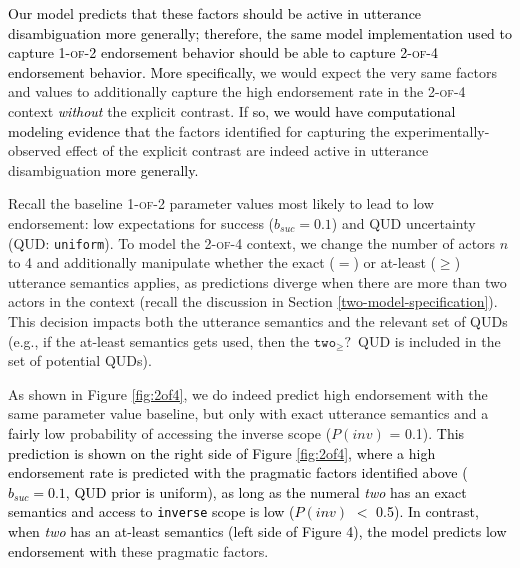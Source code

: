 \documentclass[cm]{glossa}
\newcommand{\lp}[1]{\textcolor{black}{#1}} %
\begin{document}
\lp{Our model predicts that these factors should be active in utterance disambiguation more generally; therefore, the same model implementation used to capture \textsc{1-of-2} endorsement behavior should be able to capture \textsc{2-of-4} endorsement behavior.}
\lp{More specifically,}
we would expect the very same factors and values to additionally capture the high endorsement rate in the \textsc{2-of-4} context \lp{\emph{without}} the explicit contrast. 
If \lp{so, we would have computational modeling evidence that}
the factors identified for capturing the experimentally-observed effect of the explicit contrast are indeed active in utterance disambiguation \lp{more generally.} 



Recall the baseline \textsc{1-of-2} parameter values most likely to lead to low endorsement: low expectations for success ($b_{suc}=0.1$) and QUD uncertainty (QUD: \texttt{uniform}). To model the \textsc{2-of-4} context, we change the number of actors $n$ to 4 and additionally manipulate whether the {exact} ($=$) or {at-least} ($\geq$) utterance semantics applies, as predictions diverge when there are more than two actors in the context (recall the discussion in Section \ref{two-model-specification}). This decision impacts both the utterance semantics and the relevant set of QUDs (e.g., if the at-least semantics gets used, then the $\texttt{two}_{\geq}\texttt{?}$~QUD is included in the set of potential QUDs). 

As shown in Figure \ref{fig:2of4}, we do indeed predict high endorsement with the same parameter value baseline, but only with {exact} utterance semantics and a 
\lp{fairly}
low probability of accessing the inverse scope ($P(inv)$ = 0.1).
\lp{This prediction is shown on the right side of Figure \ref{fig:2of4}, where a high endorsement rate is predicted with the pragmatic factors identified above ($b_{suc}=0.1$, QUD prior is uniform), as long as 
the numeral \textit{two} has an exact semantics and access to \texttt{inverse} scope is low ($P(inv)$ $<$ 0.5).
In contrast, when \textit{two} has an at-least semantics (left side of Figure 4), the model predicts low endorsement with} these pragmatic factors.
\end{document}
